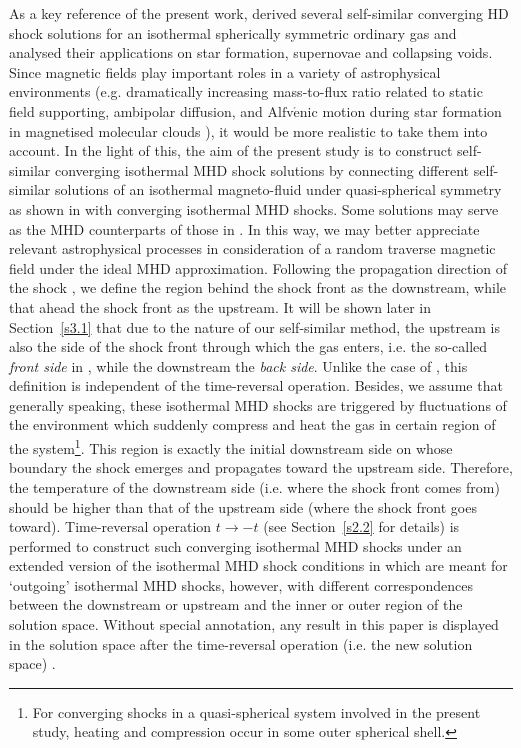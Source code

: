 \documentclass[fleqn,usenatbib]{mnras}
\begin{document}
As a key reference of the present work, \citet{lou2014self} derived several self-similar converging HD shock solutions for an isothermal spherically symmetric ordinary gas and analysed their applications on star formation, supernovae and collapsing voids. Since magnetic fields play important roles in a variety of astrophysical environments (e.g. dramatically increasing mass-to-flux ratio related to static field supporting, ambipolar diffusion, and $\text{Alfv}\mathrm{\acute{e}}\text{nic}$ motion during star formation in magnetised molecular clouds \citep{mckee2007theory,crutcher1999magnetic}), it would be more realistic to take them into account. In the light of this, the aim of the present study is to construct self-similar converging isothermal MHD shock solutions by connecting different self-similar solutions of an isothermal magneto-fluid under quasi-spherical symmetry as shown in \cite{yuLou2005} with converging isothermal MHD shocks. Some solutions may serve as the MHD counterparts of those in \citet{lou2014self}. In this way, we may better appreciate relevant astrophysical processes in consideration of a random traverse magnetic field under the ideal MHD approximation. Following the propagation direction of the shock
, we define the region behind the shock front as the downstream, while that ahead the shock front as the upstream. It will be shown later in Section~\ref{s3.1} that due to the nature of our self-similar method, the upstream is also the side of the shock front through which the gas enters, i.e. the so-called \textit{front side} in \citet{SFSW}, while the downstream the \textit{back side}. Unlike the case of \citet{lou2014self}, this definition is independent of the time-reversal operation. Besides, we assume that generally speaking, these isothermal MHD shocks are triggered by fluctuations of the environment which suddenly compress and heat the gas in certain region of the system\footnote{For converging shocks in a quasi-spherical system involved in the present study, heating and compression occur in some outer spherical shell.}. This region is exactly the initial downstream side on whose boundary the shock emerges and propagates toward the upstream side. Therefore, the temperature of the downstream side (i.e. where the shock front comes from) should be higher than that of the upstream side (where the shock front goes toward). Time-reversal operation $t\rightarrow -t$ (see Section~\ref{s2.2} for details) is performed to construct such converging isothermal MHD shocks under an extended version of the isothermal MHD shock conditions in \citet{yuLou2006} which are meant for `outgoing' isothermal MHD shocks, however, with different correspondences between the downstream or upstream and the inner or outer region of the solution space. Without special annotation, any result in this paper is displayed in the solution space after the time-reversal operation (i.e. the new solution space)
.
\end{document}
